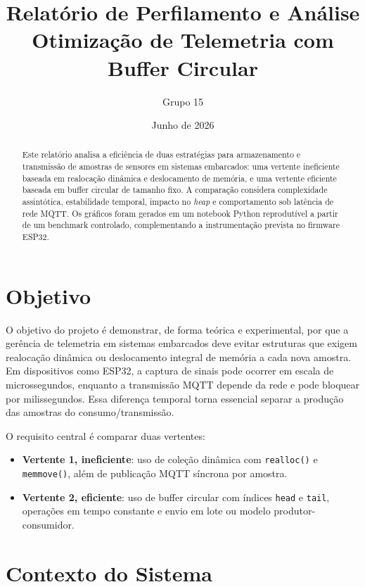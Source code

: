 \documentclass[12pt,a4paper]{article}
\title{\textbf{Relatório de Perfilamento e Análise}\\
Otimização de Telemetria com Buffer Circular}
\author{Grupo 15}
\date{Junho de 2026}
\begin{document}
\maketitle

\begin{abstract}
Este relatório analisa a eficiência de duas estratégias para armazenamento e transmissão de amostras de sensores em sistemas embarcados: uma vertente ineficiente baseada em realocação dinâmica e deslocamento de memória, e uma vertente eficiente baseada em buffer circular de tamanho fixo. A comparação considera complexidade assintótica, estabilidade temporal, impacto no \textit{heap} e comportamento sob latência de rede MQTT. Os gráficos foram gerados em um notebook Python reprodutível a partir de um benchmark controlado, complementando a instrumentação prevista no firmware ESP32.
\end{abstract}

\section{Objetivo}

O objetivo do projeto é demonstrar, de forma teórica e experimental, por que a gerência de telemetria em sistemas embarcados deve evitar estruturas que exigem realocação dinâmica ou deslocamento integral de memória a cada nova amostra. Em dispositivos como ESP32, a captura de sinais pode ocorrer em escala de microssegundos, enquanto a transmissão MQTT depende da rede e pode bloquear por milissegundos. Essa diferença temporal torna essencial separar a produção das amostras do consumo/transmissão.

O requisito central é comparar duas vertentes:

\begin{itemize}
    \item \textbf{Vertente 1, ineficiente}: uso de coleção dinâmica com \texttt{realloc()} e \texttt{memmove()}, além de publicação MQTT síncrona por amostra.
    \item \textbf{Vertente 2, eficiente}: uso de buffer circular com índices \texttt{head} e \texttt{tail}, operações em tempo constante e envio em lote ou modelo produtor-consumidor.
\end{itemize}

\section{Contexto do Sistema}
\end{document}

